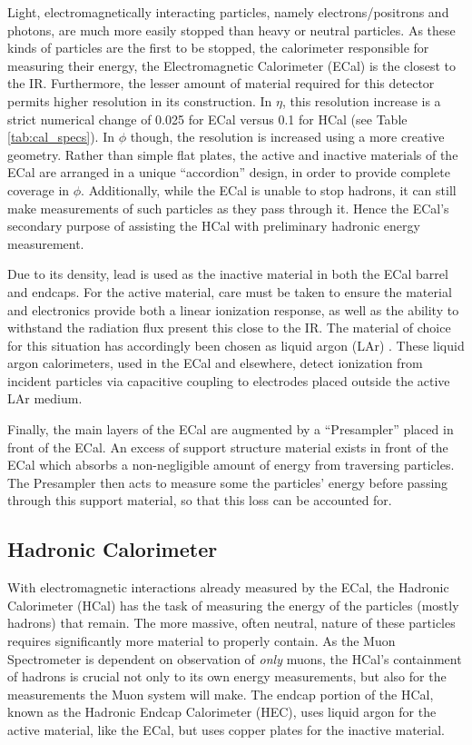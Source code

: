         Light, electromagnetically interacting particles, namely electrons/positrons and photons, are much more easily stopped than heavy or neutral particles.
        As these kinds of particles are the first to be stopped, the calorimeter responsible for measuring their energy, the Electromagnetic Calorimeter (ECal) is the closest to the IR.
        Furthermore, the lesser amount of material required for this detector permits higher resolution in its construction.
        In $\eta$, this resolution increase is a strict numerical change of 0.025 for ECal versus 0.1 for HCal (see Table \ref{tab:cal_specs}).
        In $\phi$ though, the resolution is increased using a more creative geometry.
        Rather than simple flat plates, the active and inactive materials of the ECal are arranged in a unique ``accordion'' design, in order to provide complete coverage in $\phi$.
        Additionally, while the ECal is unable to stop hadrons, it can still make measurements of such particles as they pass through it.
        Hence the ECal's secondary purpose of assisting the HCal with preliminary hadronic energy measurement.

        Due to its density, lead is used as the inactive material in both the ECal barrel and endcaps.
        For the active material, care must be taken to ensure the material and electronics provide both a linear ionization response, as well as the ability to withstand the radiation flux present this close to the IR.
        The material of choice for this situation has accordingly been chosen as liquid argon (LAr) \cite{Lar_cal_tdr}.
        These liquid argon calorimeters, used in the ECal and elsewhere, detect ionization from incident particles via capacitive coupling to electrodes placed outside the active LAr medium.

        Finally, the main layers of the ECal are augmented by a ``Presampler'' placed in front of the ECal.
        An excess of support structure material exists in front of the ECal which absorbs a non-negligible amount of energy from traversing particles.
        The Presampler then acts to measure some the particles' energy before passing through this support material, so that this loss can be accounted for.

    \subsection{Hadronic Calorimeter}

        With electromagnetic interactions already measured by the ECal,
            the Hadronic Calorimeter (HCal) has the task of measuring the energy of the particles (mostly hadrons) that remain.
        The more massive, often neutral, nature of these particles requires significantly more material to properly contain.
        As the Muon Spectrometer is dependent on observation of \textit{only} muons, the HCal's containment of hadrons is crucial not only to its own energy measurements, but also for the measurements the Muon system will make.
        The endcap portion of the HCal, known as the Hadronic Endcap Calorimeter (HEC), uses liquid argon for the active material, like the ECal, but uses copper plates for the inactive material.

